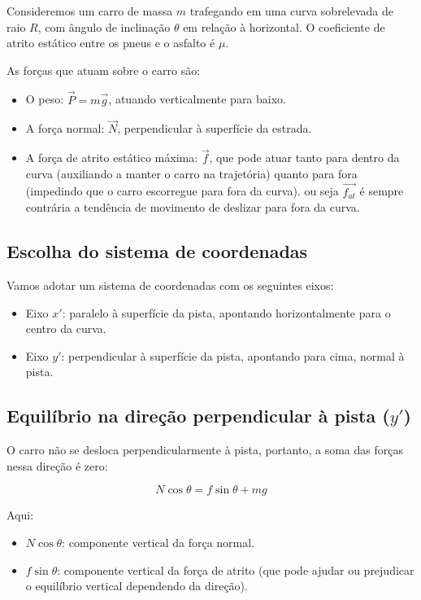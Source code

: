 \begin{flushleft}
Consideremos um carro de massa \( m \) trafegando em uma curva sobrelevada de raio \( R \), com ângulo de inclinação \(\theta\) em relação à horizontal. O coeficiente de atrito estático entre os pneus e o asfalto é \(\mu\).

As forças que atuam sobre o carro são:

\begin{itemize}
  \item O peso: \( \vec{P} = m\vec{g} \), atuando verticalmente para baixo.
  \item A força normal: \( \vec{N} \), perpendicular à superfície da estrada.
  \item A força de atrito estático máxima: \( \vec{f} \), que pode atuar tanto para dentro da curva (auxiliando a manter o carro na trajetória) quanto para fora (impedindo que o carro escorregue para fora da curva).
  ou seja \( \vec{f_{at}} \) \'e sempre contr\'aria a tend\^encia de movimento de deslizar para fora da curva.
\end{itemize}

\subsection*{Escolha do sistema de coordenadas}

Vamos adotar um sistema de coordenadas com os seguintes eixos:

\begin{itemize}
  \item Eixo \( x' \): paralelo à superfície da pista, apontando horizontalmente para o centro da curva.
  \item Eixo \( y' \): perpendicular à superfície da pista, apontando para cima, normal à pista.
\end{itemize}

\subsection*{Equilíbrio na direção perpendicular à pista (\( y' \))}

O carro não se desloca perpendicularmente à pista, portanto, a soma das forças nessa direção é zero:

\begin{equation}
N \cos\theta = f \sin\theta + mg
\label{eq:equilibrio_y}
\end{equation}

Aqui:

\begin{itemize}
  \item \( N \cos\theta \): componente vertical da força normal.
  \item \( f \sin\theta \): componente vertical da força de atrito (que pode ajudar ou prejudicar o equilíbrio vertical dependendo da direção).
\end{itemize}


\end{flushleft}
